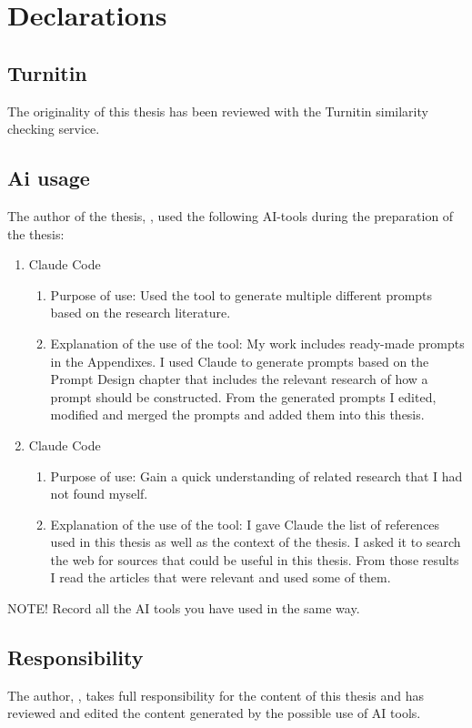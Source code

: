 
{}   %
\section*{Declarations}
\subsection*{Turnitin}
The originality of this thesis has been reviewed with the Turnitin similarity checking service.

\subsection*{Ai usage}

The author of the thesis, \myname, used the following AI-tools during the preparation of the thesis:
\begin{enumerate}
	\item Claude Code
	      \begin{enumerate}
		      \item[a.] Purpose of use: Used the tool to generate multiple different prompts based on the research literature.
		      \item[b.] Explanation of the use of the tool: My work includes ready-made prompts in the Appendixes. I used Claude to generate prompts based on the Prompt Design chapter that includes the relevant research of how a prompt should be constructed. From the generated prompts I edited, modified and merged the prompts and added them into this thesis.
	      \end{enumerate}
	\item Claude Code
	      \begin{enumerate}
		      \item[a.] Purpose of use: Gain a quick understanding of related research that I had not found myself.
		      \item[b.] Explanation of the use of the tool: I gave Claude the list of references used in this thesis as well as the context of the thesis. I asked it to search the web for sources that could be useful in this thesis. From those results I read the articles that were relevant and used some of them.
	      \end{enumerate}
\end{enumerate}

NOTE! Record all the AI tools you have used in the same way.

\subsection*{Responsibility}
The author, \myname, takes full responsibility for the content of this thesis and has reviewed and edited the content generated by the possible use of AI tools.

\clearpage  %
